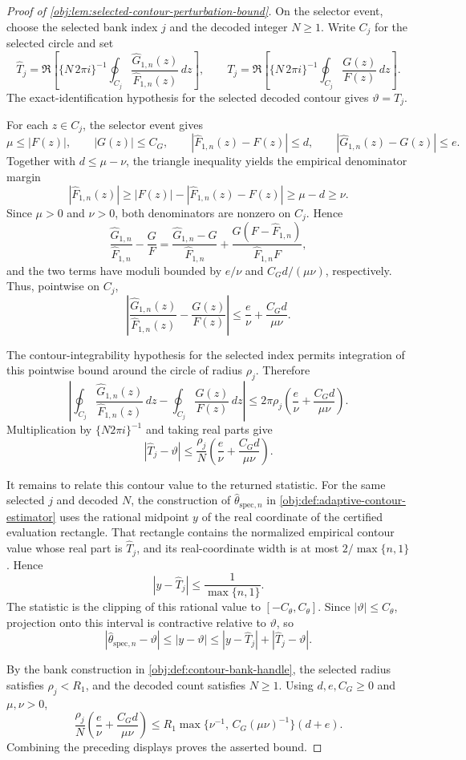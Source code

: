 \begin{proof}[Proof of \cref{obj:lem:selected-contour-perturbation-bound}]
On the selector event, choose the selected bank index \(j\) and the decoded integer
\(N\ge1\).  Write \(C_j\) for the selected circle and set
\[
\widehat T_j
=
\Re\left[
\{N\,2\pi i\}^{-1}
\oint_{C_j}
\frac{\widehat G_{1,n}(z)}{\widehat F_{1,n}(z)}\,dz
\right],
\qquad
T_j
=
\Re\left[
\{N\,2\pi i\}^{-1}
\oint_{C_j}
\frac{G(z)}{F(z)}\,dz
\right].
\]
The exact-identification hypothesis for the selected decoded contour gives
\(\vartheta=T_j\).

For each \(z\in C_j\), the selector event gives
\[
\mu\le |F(z)|,
\qquad
|G(z)|\le C_G,
\qquad
|\widehat F_{1,n}(z)-F(z)|\le d,
\qquad
|\widehat G_{1,n}(z)-G(z)|\le e .
\]
Together with \(d\le\mu-\nu\), the triangle inequality yields the empirical
denominator margin
\[
|\widehat F_{1,n}(z)|
\ge |F(z)|-|\widehat F_{1,n}(z)-F(z)|
\ge \mu-d
\ge \nu .
\]
Since \(\mu>0\) and \(\nu>0\), both denominators are nonzero on \(C_j\).  Hence
\[
\frac{\widehat G_{1,n}}{\widehat F_{1,n}}-
\frac{G}{F}
=
\frac{\widehat G_{1,n}-G}{\widehat F_{1,n}}
+
\frac{G(F-\widehat F_{1,n})}{\widehat F_{1,n}F},
\]
and the two terms have moduli bounded by \(e/\nu\) and
\(C_Gd/(\mu\nu)\), respectively.  Thus, pointwise on \(C_j\),
\[
\left|
\frac{\widehat G_{1,n}(z)}{\widehat F_{1,n}(z)}-
\frac{G(z)}{F(z)}
\right|
\le
\frac{e}{\nu}+\frac{C_Gd}{\mu\nu}.
\]

The contour-integrability hypothesis for the selected index permits integration
of this pointwise bound around the circle of radius \(\rho_j\).  Therefore
\[
\left|
\oint_{C_j}
\frac{\widehat G_{1,n}(z)}{\widehat F_{1,n}(z)}\,dz
-
\oint_{C_j}
\frac{G(z)}{F(z)}\,dz
\right|
\le
2\pi\rho_j
\left(\frac{e}{\nu}+\frac{C_Gd}{\mu\nu}\right).
\]
Multiplication by \(\{N2\pi i\}^{-1}\) and taking real parts give
\[
|\widehat T_j-\vartheta|
\le
\frac{\rho_j}{N}
\left(\frac{e}{\nu}+\frac{C_Gd}{\mu\nu}\right).
\]

It remains to relate this contour value to the returned statistic.  For the same
selected \(j\) and decoded \(N\), the construction of
\(\widehat\theta_{\mathrm{spec},n}\) in
\cref{obj:def:adaptive-contour-estimator} uses the rational midpoint \(y\) of the
real coordinate of the certified evaluation rectangle.  That rectangle contains
the normalized empirical contour value whose real part is \(\widehat T_j\), and
its real-coordinate width is at most \(2/\max\{n,1\}\).  Hence
\[
|y-\widehat T_j|\le \frac{1}{\max\{n,1\}}.
\]
The statistic is the clipping of this rational value to
\([-C_{\theta},C_{\theta}]\).  Since \(|\vartheta|\le C_{\theta}\), projection
onto this interval is contractive relative to \(\vartheta\), so
\[
|\widehat\theta_{\mathrm{spec},n}-\vartheta|
\le |y-\vartheta|
\le |y-\widehat T_j|+|\widehat T_j-\vartheta|.
\]

By the bank construction in \cref{obj:def:contour-bank-handle}, the selected
radius satisfies \(\rho_j<R_1\), and the decoded count satisfies \(N\ge1\).  Using
\(d,e,C_G\ge0\) and \(\mu,\nu>0\),
\[
\frac{\rho_j}{N}
\left(\frac{e}{\nu}+\frac{C_Gd}{\mu\nu}\right)
\le
R_1\max\{\nu^{-1},\,C_G(\mu\nu)^{-1}\}(d+e).
\]
Combining the preceding displays proves the asserted bound.
\end{proof}
